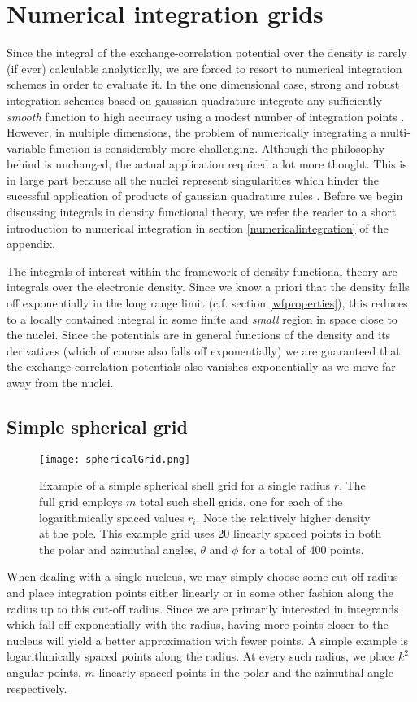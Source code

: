 \documentclass[../../master.tex]{subfiles}
\begin{document}
\section{Numerical integration grids}
Since the integral of the exchange-correlation potential over the density is rarely (if ever) calculable analytically, we are forced to resort to numerical integration schemes in order to evaluate it. In the one dimensional case, strong and robust integration schemes based on gaussian quadrature integrate any sufficiently \emph{smooth} function to high accuracy using a modest number of integration points \cite{hjorthjensen}. However, in multiple dimensions, the problem of numerically integrating a multi-variable function is considerably more challenging. Although the philosophy behind is unchanged, the actual application required a lot more thought. This is in large part because all the nuclei represent singularities which hinder the sucessful application of products of gaussian quadrature rules \cite{voronoi1}. Before we begin discussing integrals in density functional theory, we refer the reader to a short introduction to numerical integration in section \ref{numericalintegration} of the appendix. 

The integrals of interest within the framework of density functional theory are integrals over the electronic density. Since we know a priori that the density falls off exponentially in the long range limit (c.f. section \ref{wfproperties}), this reduces to a locally contained integral in some finite and \emph{small} region in space close to the nuclei. Since the potentials are in general functions of the density and its derivatives (which of course also falls off exponentially) we are guaranteed that the exchange-correlation potentials also vanishes exponentially as we move far away from the nuclei. 

\subsection{Simple spherical grid}
\begin{SCfigure}
\centering
\texttt{[image: sphericalGrid.png]}
\caption{Example of a simple spherical shell grid for a single radius $r$. The full grid employs $m$ total such shell grids, one for each of the logarithmically spaced values $r_i$. Note the relatively higher density at the pole. This example grid uses 20 linearly spaced points in both the polar and azimuthal angles, $\theta$ and $\phi$ for a total of 400 points.\label{fig:dft2}}
\end{SCfigure}
When dealing with a single nucleus, we may simply choose some cut-off radius and place integration points either linearly or in some other fashion along the radius up to this cut-off radius. Since we are primarily interested in integrands which fall off exponentially with the radius, having more points closer to the nucleus will yield a better approximation with fewer points. A simple example is logarithmically spaced points along the radius. At every such radius, we place $k^2$ angular points, $m$ linearly spaced points in the polar and the azimuthal angle respectively.
\end{document}
